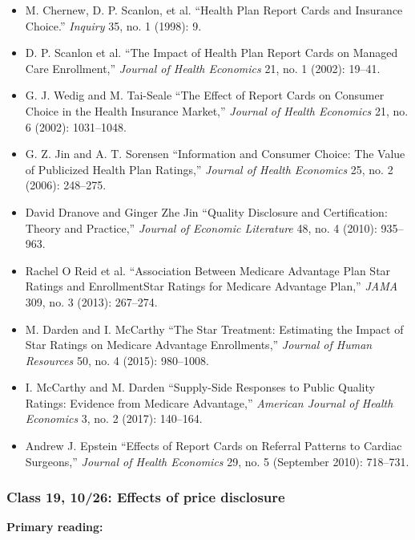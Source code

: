\documentclass[11pt,]{article}
\providecommand{\tightlist}{%
  \setlength{\itemsep}{0pt}\setlength{\parskip}{0pt}}
\begin{document}
\begin{itemize}
\tightlist
\item
  M. Chernew, D. P. Scanlon, et al. {``Health Plan Report Cards and
  Insurance Choice.''} \emph{Inquiry} 35, no. 1 (1998): 9.
\item
  D. P. Scanlon et al. {``The Impact of Health Plan Report Cards on
  Managed Care Enrollment,''} \emph{Journal of Health Economics} 21, no.
  1 (2002): 19--41.
\item
  G. J. Wedig and M. Tai-Seale {``The Effect of Report Cards on Consumer
  Choice in the Health Insurance Market,''} \emph{Journal of Health
  Economics} 21, no. 6 (2002): 1031--1048.
\item
  G. Z. Jin and A. T. Sorensen {``Information and Consumer Choice: The
  Value of Publicized Health Plan Ratings,''} \emph{Journal of Health
  Economics} 25, no. 2 (2006): 248--275.
\item
  David Dranove and Ginger Zhe Jin {``Quality {Disclosure} and
  {Certification}: {Theory} and {Practice},''} \emph{Journal of Economic
  Literature} 48, no. 4 (2010): 935--963.
\item
  Rachel O Reid et al. {``Association {Between} {Medicare} {Advantage}
  {Plan} {Star} {Ratings} and {EnrollmentStar} {Ratings} for {Medicare}
  {Advantage} {Plan},''} \emph{JAMA} 309, no. 3 (2013): 267--274.
\item
  M. Darden and I. McCarthy {``The {Star} {Treatment}: {Estimating} the
  {Impact} of {Star} {Ratings} on {Medicare} {Advantage}
  {Enrollments},''} \emph{Journal of Human Resources} 50, no. 4 (2015):
  980--1008.
\item
  I. McCarthy and M. Darden {``Supply-Side {Responses} to {Public}
  {Quality} {Ratings}: {Evidence} from {Medicare} {Advantage},''}
  \emph{American Journal of Health Economics} 3, no. 2 (2017): 140--164.
\item
  Andrew J. Epstein {``Effects of Report Cards on Referral Patterns to
  Cardiac Surgeons,''} \emph{Journal of Health Economics} 29, no. 5
  (September 2010): 718--731.
\end{itemize}

\hypertarget{class-19-1026-effects-of-price-disclosure}{%
\subsubsection{Class 19, 10/26: Effects of price
disclosure}\label{class-19-1026-effects-of-price-disclosure}}

\textbf{Primary reading:}
\end{document}
